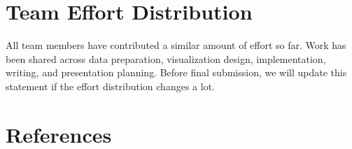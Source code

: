 \documentclass[11pt]{article}
\begin{document}
\section{Team Effort Distribution}

All team members have contributed a similar amount of effort so far. Work has been shared across data preparation, visualization design, implementation, writing, and presentation planning. Before final submission, we will update this statement if the effort distribution changes a lot.

\section{References}
\vspace{-0.6em}
\renewcommand{\refname}{}


\end{document}
